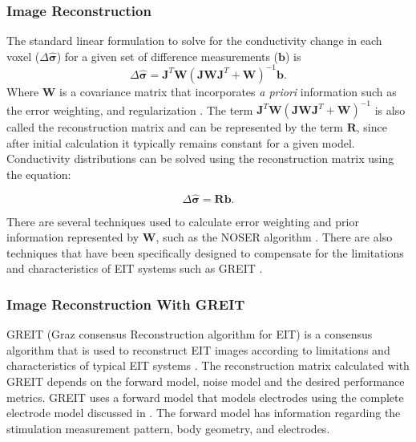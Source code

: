 \subsubsection{Image Reconstruction}
The standard linear formulation \parencite{holder_electrical_2004} 
to solve for the conductivity change in each 
voxel ($\Delta \mathbf{\hat{\sigma}}$) for a given set of difference measurements ($\mathbf{b}$) is
\begin{equation}
	\Delta \mathbf{\hat{\sigma}} = \mathbf{J}^T \mathbf{W} 
	(\mathbf{J} \mathbf{W} \mathbf{J}^T + \mathbf{W})^{-1} \mathbf{b}. 
\end{equation}
Where $\mathbf{W}$ is a covariance matrix that incorporates \emph{a priori} information such 
as the error weighting, and regularization \parencite{adler_electrical_1996}.
The term $ \mathbf{J}^T \mathbf{W} 
(\mathbf{J} \mathbf{W} \mathbf{J}^T + \mathbf{W})^{-1} $ is also called the 
reconstruction matrix and can be represented by the term
$\mathbf{R}$, since after initial calculation it typically remains constant for a given model. 
Conductivity distributions can be solved using the reconstruction matrix using the equation:

\begin{equation} \label{eq:rm_solve}
	\Delta \mathbf{\hat{\sigma}} = \mathbf{R} \mathbf{b}. 
\end{equation}

There are several techniques used to calculate error weighting and prior information represented by 
$\mathbf{W}$,
such as the NOSER algorithm \parencite{cheney_noser_1990}. There are also 
techniques that have been specifically designed 
to compensate for the limitations and characteristics of EIT systems 
such as GREIT \parencite{adler_greit_2009}.

\subsubsection{Image Reconstruction With GREIT}

GREIT (Graz consensus Reconstruction algorithm for EIT) is 
a consensus algorithm that is used to reconstruct EIT images 
according to limitations and characteristics of typical EIT systems 
\parencite{adler_greit_2009}. 
The reconstruction matrix calculated with GREIT depends on the
forward model, noise model and the desired performance metrics.
GREIT uses a forward model that models electrodes using 
the complete electrode model discussed in .
The forward model has information regarding the stimulation measurement pattern,
body geometry, and electrodes.


